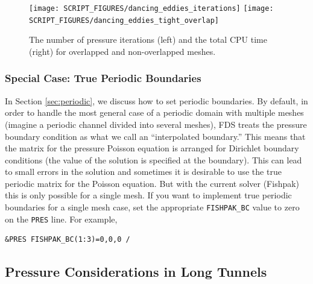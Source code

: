 \documentclass[11pt]{book}
\begin{document}
\begin{figure}[ht]
\texttt{[image: SCRIPT\_FIGURES/dancing\_eddies\_iterations]}
\texttt{[image: SCRIPT\_FIGURES/dancing\_eddies\_tight\_overlap]}
\caption[Reduction of pressure iterations in the {\ct dancing\_eddies} test cases]{The number of pressure iterations (left) and the total CPU time (right) for overlapped and non-overlapped meshes.}
\label{dancing_eddies_overlap}
\end{figure}

\subsubsection{Special Case: True Periodic Boundaries}
\label{sec:true_periodic_boundaries}

In Section \ref{sec:periodic}, we discuss how to set periodic boundaries.  By default, in order to handle the most general case of a periodic domain with multiple meshes (imagine a periodic channel divided into several meshes), FDS treats the pressure boundary condition as what we call an ``interpolated boundary.''  This means that the matrix for the pressure Poisson equation is arranged for Dirichlet boundary conditions (the value of the solution is specified at the boundary).  This can lead to small errors in the solution and sometimes it is desirable to use the true periodic matrix for the Poisson equation.  But with the current solver (Fishpak) this is only possible for a single mesh.  If you want to implement true periodic boundaries for a single mesh case, set the appropriate \verb=FISHPAK_BC= value to zero on the \verb=PRES= line.  For example,
\begin{lstlisting}
&PRES FISHPAK_BC(1:3)=0,0,0 /
\end{lstlisting}



\subsection{Pressure Considerations in Long Tunnels}
\label{tunnel_demo}
\end{document}
